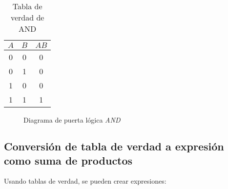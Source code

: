 \documentclass[12pt]{article}
\begin{document}
            \begin{multicols}{2}
\begin{table}[H]
    \centering
                \begin{tabular}{|c c|c}
                    $A$ & $B$ & $AB$ \\
                    \hline
                    0 & 0 & 0 \\
                    0 & 1 & 0 \\
                    1 & 0 & 0 \\
                    1 & 1 & 1
                \end{tabular}
    \caption{Tabla de verdad de AND}
    \label{tab:my_label}
\end{table}


                \columnbreak
                \newpage
                \begin{figure}[H]
                    \centering
                    
                    \caption{Diagrama de puerta lógica \textit{AND} \cite{logic_gate}}
                    \label{fig:and}
                \end{figure}
            \end{multicols}

    \newpage
    \subsection{Conversión de tabla de verdad a expresión como suma de productos \cite{floyd_fundamentos_2006}}
        Usando tablas de verdad, se pueden crear expresiones:
\end{document}
